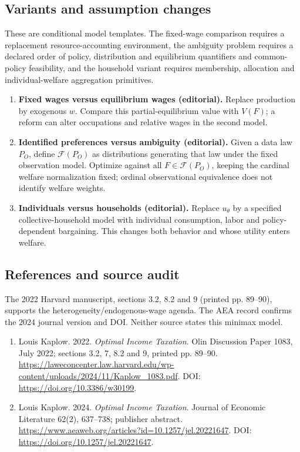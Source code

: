 \documentclass[11pt,a4paper]{article}
\begin{document}
\subsection*{Variants and assumption changes}
These are conditional model templates. The fixed-wage comparison requires a replacement resource-accounting environment, the ambiguity problem requires a declared order of policy, distribution and equilibrium quantifiers and common-policy feasibility, and the household variant requires membership, allocation and individual-welfare aggregation primitives.
\begin{enumerate}
\item \textbf{Fixed wages versus equilibrium wages (editorial).} Replace production by exogenous \(w\). Compare this partial-equilibrium value with \(V(F)\); a reform can alter occupations and relative wages in the second model.
\item \textbf{Identified preferences versus ambiguity (editorial).} Given a data law \(P_O\), define \(\mathcal F(P_O)\) as distributions generating that law under the fixed observation model. Optimize against all \(F\in\mathcal F(P_O)\), keeping the cardinal welfare normalization fixed; ordinal observational equivalence does not identify welfare weights.
\item \textbf{Individuals versus households (editorial).} Replace \(u_\theta\) by a specified collective-household model with individual consumption, labor and policy-dependent bargaining. This changes both behavior and whose utility enters welfare.
\end{enumerate}
\subsection*{References and source audit}
The 2022 Harvard manuscript, sections 3.2, 8.2 and 9 (printed pp. 89--90), supports the heterogeneity/endogenous-wage agenda. The AEA record confirms the 2024 journal version and DOI. Neither source states this minimax model.
\begin{enumerate}\raggedright
\item\hypertarget{definitions:source:30007752:1}{} Louis Kaplow. 2022. \emph{Optimal Income Taxation}. Olin Discussion Paper 1083, July 2022; sections 3.2, 7, 8.2 and 9, printed pp. 89–90.
\url{https://laweconcenter.law.harvard.edu/wp-content/uploads/2024/11/Kaplow_1083.pdf}.
DOI: \url{https://doi.org/10.3386/w30199}.
\item\hypertarget{definitions:source:30007752:2}{} Louis Kaplow. 2024. \emph{Optimal Income Taxation}. Journal of Economic Literature 62(2), 637–738; publisher abstract.
\url{https://www.aeaweb.org/articles?id=10.1257/jel.20221647}.
DOI: \url{https://doi.org/10.1257/jel.20221647}.
\end{enumerate}
\end{document}
